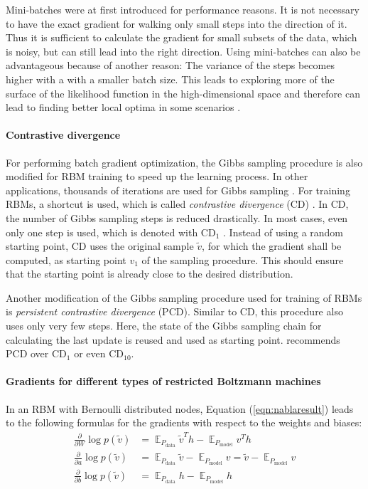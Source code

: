 \documentclass[12pt]{article}
\DeclareMathOperator{\EX}{\mathbb{E}}
\begin{document}
Mini-batches were at first introduced for performance reasons.
It is not necessary to have the exact gradient for walking only small steps into the direction of it.
Thus it is sufficient to calculate the gradient for small subsets of the data, which is noisy, but can still lead into the right direction.
Using mini-batches can also be advantageous because of another reason: The variance of the steps becomes higher with a with a smaller batch size. This leads to exploring more of the surface of the likelihood function in the high-dimensional space and therefore can lead to finding better local optima in some scenarios \citep{bengio2012practical}.

\paragraph{Contrastive divergence}

For performing batch gradient optimization, the Gibbs sampling procedure is also modified for RBM training to speed up the learning process.
In other applications, thousands of iterations are used for Gibbs sampling  \citep{gibbssamplingorig}. For training RBMs, a shortcut is used, which is called {\em contrastive divergence} (CD) \citep{cdorig, perpinan_contrastive_2005}.
In CD, the number of Gibbs sampling steps is reduced drastically. In most cases, even only one step is used, which is denoted with $\text{CD}_1$ \citep{hinton_practical_2012}.
Instead of using a random starting point, CD uses the original sample $\tilde{v}$, for which the gradient shall be computed, as starting point $v_1$ of the sampling procedure. This should ensure that the starting point is already close to the desired distribution.

Another modification of the Gibbs sampling procedure used for training of RBMs is {\em persistent contrastive divergence} (PCD).
Similar to CD, this procedure also uses only very few steps. Here, the state of the Gibbs sampling chain for calculating the last update is reused and used as starting point. \cite{hinton_practical_2012} recommends PCD over $\text{CD}_1$ or even $\text{CD}_{10}$.

\paragraph{Gradients for different types of restricted Boltzmann machines}\label{rbmgradients}

In an RBM with Bernoulli distributed nodes, Equation (\ref{eqn:nablaresult}) leads to the following formulas for the gradients with respect to the weights and biases:
\begin{align*}
\frac{\partial}{\partial W}  \log p(\tilde{v}) &= \EX_{P_\text{data}}  \tilde{v}^T h - \EX_{P_\text{model}} v^T h \\
\frac{\partial}{\partial a}  \log p(\tilde{v}) &=  \EX_{P_\text{data}}
\tilde{v} - \EX_{P_\text{model}}  v = \tilde{v} - \EX_{P_\text{model}} v\\
\frac{\partial}{\partial b}  \log p(\tilde{v}) &=  \EX_{P_\text{data}} h - \EX_{P_\text{model}} h
\end{align*}
\end{document}
